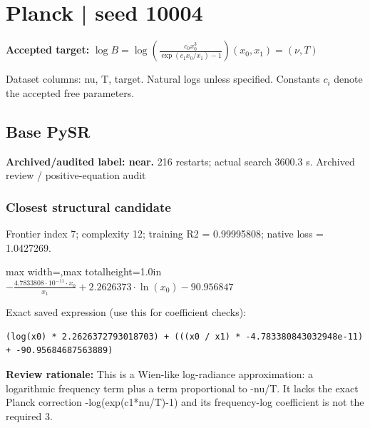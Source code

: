 \documentclass[10pt,letterpaper,landscape]{article}
\begin{document}
\section*{Planck | seed 10004}
\textbf{Accepted target:} $\displaystyle \log B=\log\!\left(\frac{c_0 x_0^3}{\exp(c_1x_0/x_1)-1}\right)$\hfill $(x_0,x_1)=(\nu,T)$\par
{\small Dataset columns: nu, T, target. Natural logs unless specified. Constants $c_i$ denote the accepted free parameters.}\par\medskip
\begin{minipage}[t]{0.485\textwidth}
\subsection*{Base PySR}
\textbf{Archived/audited label: near.} 216 restarts; actual search 3600.3 s.
{\small Archived review / positive-equation audit}
\subsubsection*{Closest structural candidate}
Frontier index 7; complexity 12; training R2 = 0.99995808; native loss = 1.0427269.
\begin{center}\begin{adjustbox}{max width=\linewidth,max totalheight=1.0in}$\displaystyle - \frac{4.7833808 \cdot 10^{-11} \cdot x_{0}}{x_{1}} + 2.2626373 \cdot \ln{\left(x_{0} \right)} - 90.956847$\end{adjustbox}\end{center}
{\scriptsize Exact saved expression (use this for coefficient checks):}
\begin{lstlisting}
(log(x0) * 2.2626372793018703) + (((x0 / x1) * -4.783380843032948e-11) + -90.95684687563889)
\end{lstlisting}
{\small\textbf{Review rationale:} This is a Wien-like log-radiance approximation: a logarithmic frequency term plus a term proportional to -nu/T. It lacks the exact Planck correction -log(exp(c1*nu/T)-1) and its frequency-log coefficient is not the required 3.}

\end{minipage}
\end{document}
